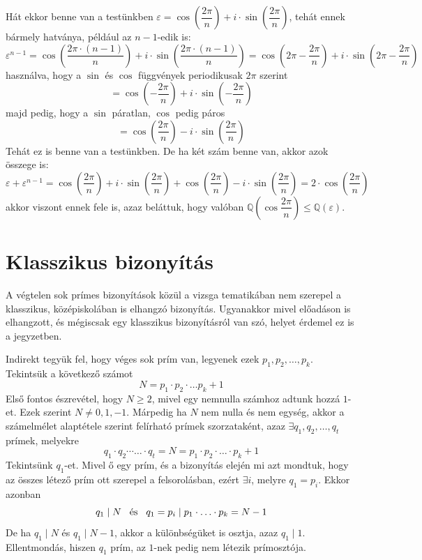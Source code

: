 \documentclass[12pt]{book}
\theoremstyle{plain} %
\theoremstyle{definition} %
\theoremstyle{remark}
\numberwithin{equation}{section}  %
\def\Q{\mathbb{Q}}
\begin{document}
	Hát ekkor benne van a testünkben $\varepsilon =\cos \left( \dfrac{2\pi}{n} \right)+ i\cdot \sin \left( \dfrac{2\pi}{n} \right) $, tehát ennek bármely hatványa, például az $n-1$-edik is:
	\[ \varepsilon^{n-1} = \cos \left( \dfrac{2\pi \cdot (n-1)}{n} \right) + i\cdot \sin \left( \dfrac{2\pi \cdot (n-1)}{n} \right) = \cos \left( 2\pi - \dfrac{2\pi }{n} \right) + i\cdot \sin \left( 2\pi - \dfrac{2\pi}{n} \right)  \]
	használva, hogy a $\sin$ és $\cos$ függvények periodikusak $2\pi$ szerint
	\[ = \cos \left( - \dfrac{2\pi }{n} \right) + i\cdot \sin \left(- \dfrac{2\pi}{n} \right)   \]
	majd pedig, hogy a $\sin$ páratlan, $\cos$ pedig páros
	\[ = \cos \left(\dfrac{2\pi }{n} \right) - i\cdot \sin \left( \dfrac{2\pi}{n} \right) \]
	Tehát ez is benne van a testünkben. De ha két szám benne van, akkor azok összege is:
	\[ \varepsilon + \varepsilon^{n-1} = \cos \left(\dfrac{2\pi }{n} \right) + i\cdot \sin \left( \dfrac{2\pi}{n} \right) + \cos \left(\dfrac{2\pi }{n} \right) - i\cdot \sin \left( \dfrac{2\pi}{n} \right) = 2\cdot \cos \left(\dfrac{2\pi }{n} \right) \]
	akkor viszont ennek fele is, azaz beláttuk, hogy valóban $\Q \left( \cos \dfrac{2\pi }{n} \right) \leq \Q(\varepsilon)$.
	
	\section{Klasszikus bizonyítás}
	A végtelen sok prímes bizonyítások közül a vizsga tematikában nem szerepel a klasszikus, középiskolában is elhangzó bizonyítás. Ugyanakkor mivel előadáson is elhangzott, és mégiscsak egy klasszikus bizonyításról van szó, helyet érdemel ez is a jegyzetben.
	
	Indirekt tegyük fel, hogy véges sok prím van, legyenek ezek $ p_1, p_2, \ldots, p_k $. Tekintsük a következő számot
	\[ N = p_1\cdot p_2 \cdot \ldots p_k +1  \]
	Első fontos észrevétel, hogy $ N\geq 2 $, mivel egy nemnulla számhoz adtunk hozzá $1$-et. Ezek szerint $N\neq 0,1,-1$. Márpedig ha $N$ nem nulla és nem egység, akkor a számelmélet alaptétele szerint felírható prímek szorzataként, azaz $\exists q_1, q_2, \ldots, q_t$ prímek, melyekre
	\[ q_1\cdot q_2 \cdots \ldots \cdot q_t = N = p_1\cdot p_2\cdot \ldots \cdot p_k + 1  \]
	Tekintsünk $q_1$-et. Mivel ő egy prím, és a bizonyítás elején mi azt mondtuk, hogy az összes létező prím ott szerepel a felsorolásban, ezért $\exists i$, melyre $q_1 = p_i$. Ekkor azonban
	\[ q_1 \mid N \hspace{3mm} \text{és} \hspace{3mm} q_1=p_i \mid p_1\cdot \ldots \cdot p_k = N - 1  \]
	De ha $ q_1 \mid N $ és $ q_1\mid N-1 $, akkor a különbségüket is osztja, azaz $ q_1 \mid 1 $. Ellentmondás, hiszen $q_1$ prím, az $1$-nek pedig nem létezik prímosztója.
	
\end{document}
